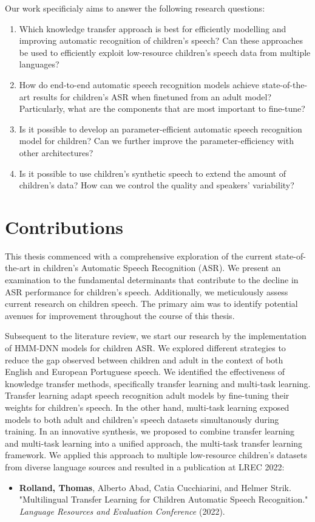 Our work specificialy aims to answer the following research questions:
\begin{enumerate} 
\item Which knowledge transfer approach is best for efficiently modelling and improving automatic recognition of children's speech? Can these approaches be used to efficiently exploit low-resource children's speech data from multiple languages?
\item  How do end-to-end automatic speech recognition models achieve state-of-the-art results for children's \ac{ASR} when finetuned from an adult model? Particularly, what are the components that are most important to fine-tune?
\item Is it possible to develop an parameter-efficient automatic speech recognition model for children? Can we further improve the parameter-efficiency with other architectures? 
\item Is it possible to use children's synthetic speech to extend the amount of children's data? How can we control the quality and speakers’ variability?
\end{enumerate}

\section{Contributions}
This thesis commenced with a comprehensive exploration of the current state-of-the-art in children's Automatic Speech Recognition (\ac{ASR}). We present an examination to the fundamental determinants that contribute to the decline in \ac{ASR} performance for children's speech. Additionally, we meticulously assess current research on children speech. The primary aim was to identify potential avenues for improvement throughout the course of this thesis. 

Subsequent to the literature review, we start our research by the implementation of \ac{HMM-DNN} models for children \ac{ASR}. We explored different strategies to reduce the gap observed between children and adult in the context of both English and European Portuguese speech. We identified the effectiveness of knowledge transfer methods, specifically transfer learning and multi-task learning. Transfer learning adapt speech recognition adult models by fine-tuning their weights for children's speech. In the other hand, multi-task learning exposed models to both adult and children's speech datasets simultanously during training. In an innovative synthesis, we proposed to combine transfer learning and multi-task learning into a unified approach, the multi-task transfer learning framework. We applied this approach to multiple low-resource children's datasets from diverse language sources and resulted in a publication at LREC 2022:
\begin{itemize}
    \item \textbf{Rolland, Thomas}, Alberto Abad, Catia Cucchiarini, and Helmer Strik. "Multilingual Transfer Learning for Children Automatic Speech Recognition." \textit{ Language Resources and Evaluation Conference} (2022).
\end{itemize}

